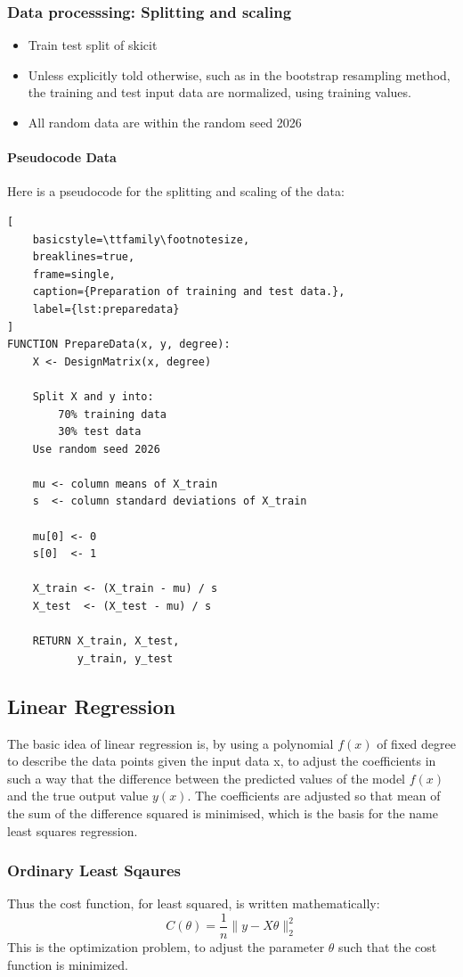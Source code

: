 \documentclass[aps,rmp,reprint,amsmath,amssymb,longbibliography]{revtex4-1}
\begin{document}
\subsubsection{Data processsing: Splitting and scaling}
\begin{itemize}
\item Train test split of skicit
\item Unless explicitly told otherwise, such as in the bootstrap resampling method,
the training and test input data are normalized, using training values.
\item All random data are within the random seed 2026
\end{itemize}

\paragraph{Pseudocode Data}
Here is a pseudocode for the splitting and scaling of the data:
\begin{lstlisting}[
    basicstyle=\ttfamily\footnotesize,
    breaklines=true,
    frame=single,
    caption={Preparation of training and test data.},
    label={lst:preparedata}
]
FUNCTION PrepareData(x, y, degree):
    X <- DesignMatrix(x, degree)

    Split X and y into:
        70% training data
        30% test data
    Use random seed 2026

    mu <- column means of X_train
    s  <- column standard deviations of X_train

    mu[0] <- 0
    s[0]  <- 1

    X_train <- (X_train - mu) / s
    X_test  <- (X_test - mu) / s

    RETURN X_train, X_test,
           y_train, y_test
\end{lstlisting}

\subsection{Linear Regression}
The basic idea of linear regression is, by using a polynomial $f(x)$
of fixed degree to describe the data points given the input
data x, to adjust the coefficients in such a way that the difference
between the predicted values of the model $f(x)$ and the true output value
$y(x)$. The coefficients are adjusted so that mean of the sum of the difference squared
is minimised, which is the basis for the name least squares regression.
\subsubsection{Ordinary Least Sqaures}
Thus the cost function, for least squared, is written mathematically:
\begin{equation}
  C(\theta) = \frac{1}{n}\lVert y - X\theta\rVert_2^2
\end{equation}
\cite[p.~81]{LectureNotes}
This is the optimization problem, to adjust the parameter $\theta$ such that the cost function is minimized.
\end{document}
